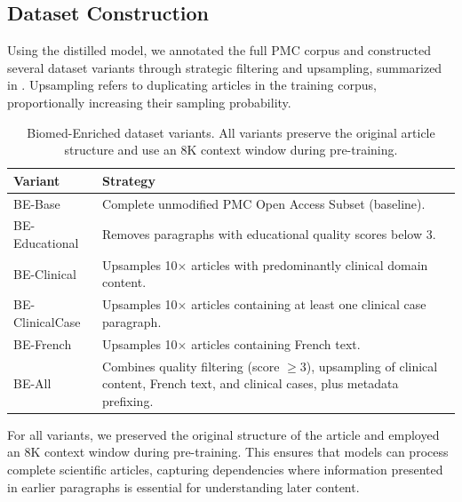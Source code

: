 \subsection{Dataset Construction}
\label{sec:dataset}

\begin{reviewread}
Using the distilled model, we annotated the full PMC corpus and constructed several dataset variants through strategic filtering and upsampling, summarized in . Upsampling refers to duplicating articles in the training corpus, proportionally increasing their sampling probability.
\end{reviewread}

\begin{table}[t]
\centering
\small
\renewcommand{\arraystretch}{1.6}
\begin{tabular}{lp{8.5cm}}
\toprule
\textbf{Variant} & \textbf{Strategy} \\
\midrule
BE-Base & Complete unmodified PMC Open Access Subset (baseline). \\
BE-Educational & Removes paragraphs with educational quality scores below 3. \\
BE-Clinical & Upsamples 10$\times$ articles with predominantly clinical domain content. \\
BE-ClinicalCase & Upsamples 10$\times$ articles containing at least one clinical case paragraph. \\
BE-French & Upsamples 10$\times$ articles containing French text. \\
BE-All & Combines quality filtering (score $\geq 3$), upsampling of clinical content, French text, and clinical cases, plus metadata prefixing. \\
\bottomrule
\end{tabular}
\renewcommand{\arraystretch}{1.0}
\caption{Biomed-Enriched dataset variants. All variants preserve the original article structure and use an 8K context window during pre-training.}
\label{tab:be-variants}
\end{table}

\begin{reviewread}
For all variants, we preserved the original structure of the article and employed an 8K context window during pre-training. This ensures that models can process complete scientific articles, capturing dependencies where information presented in earlier paragraphs is essential for understanding later content.
\end{reviewread}


